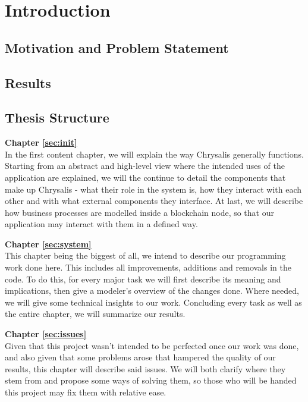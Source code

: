 %
\chapter{Introduction}
\label{sec:intro}




\section{Motivation and Problem Statement}
\label{sec:intro:motivation}


\section{Results}
\label{sec:intro:results}


\section{Thesis Structure}
\label{sec:intro:structure}

\textbf{Chapter \ref{sec:init}} \\[0.2em]
In the first content chapter, we will explain the way Chrysalis generally functions. Starting from an abstract and high-level view where the intended uses of the application are explained, we will the continue to detail the components that make up Chrysalis - what their role in the system is, how they interact with each other and with what external components they interface. At last, we will describe how business processes are modelled inside a blockchain node, so that our application may interact with them in a defined way.

\textbf{Chapter \ref{sec:system}} \\[0.2em]
This chapter being the biggest of all, we intend to describe our programming work done here. This includes all improvements, additions and removals in the code. To do this, for every major task we will first describe its meaning and implications, then give a modeler's overview of the changes done. Where needed, we will give some technical insights to our work. Concluding every task as well as the entire chapter, we will summarize our results.

\textbf{Chapter \ref{sec:issues}} \\[0.2em]
Given that this project wasn't intended to be perfected once our work was done, and also given that some problems arose that hampered the quality of our results, this chapter will describe said issues. We will both clarify where they stem from and propose some ways of solving them, so those who will be handed this project may fix them with relative ease.

